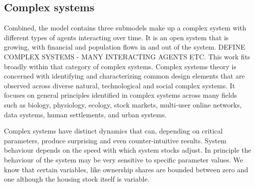 
\subsection{Complex systems}

Combined, the model contains three submodels %
make up a complex system with different types of agents interacting over time. It is an \gls{open system} that is growing, with financial and population flows in and out of the system. 
DEFINE COMPLEX SYSTEMS - MANY INTERACTING AGENTS ETC.
This work fits broadly within that category of complex systems. 
Complex systems theory is concerned with identifying and characterizing common design elements that are observed across diverse natural, technological and social complex systems. It focuses on general principles  identified in complex systems across many fields such as biology, physiology, ecology, stock markets, multi-user online  networks, data systems, human settlements, and urban systems. 



Complex systems have distinct dynamics that can, depending on \glspl{critical parameter}, produce surprising and even counter-intuitive results.  %
System behaviour depends on the speed with which system stocks adjust. In principle the behaviour of the system may be very sensitive to specific parameter values. We know that certain variables, like ownership  shares are bounded between zero and one although the housing stock itself is variable.  



